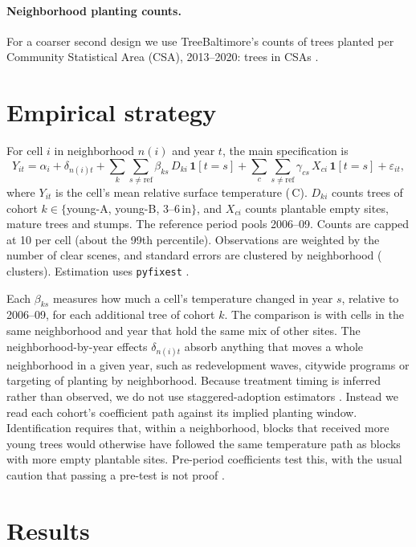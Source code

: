 \documentclass[11pt]{article}
\newcommand{\degC}{\,\textdegree C}
\begin{document}
\paragraph{Neighborhood planting counts.} For a coarser second design we use TreeBaltimore's counts of trees planted per Community Statistical Area (CSA), 2013--2020: \CSATrees{} trees in \NCSA{} CSAs \citep{bnia}.

\section{Empirical strategy}

For cell $i$ in neighborhood $n(i)$ and year $t$, the main specification is
\begin{equation}
Y_{it} = \alpha_i + \delta_{n(i)t} + \sum_{k}\sum_{s\neq \mathrm{ref}} \beta_{ks}\, D_{ki}\, \mathbf{1}[t=s] + \sum_{c}\sum_{s\neq \mathrm{ref}} \gamma_{cs}\, X_{ci}\, \mathbf{1}[t=s] + \varepsilon_{it},
\label{eq:es}
\end{equation}
where $Y_{it}$ is the cell's mean relative surface temperature (\degC). $D_{ki}$ counts trees of cohort $k\in\{$young-A, young-B, 3--6\,in$\}$, and $X_{ci}$ counts plantable empty sites, mature trees and stumps. The reference period pools 2006--09. Counts are capped at 10 per cell (about the 99th percentile). Observations are weighted by the number of clear scenes, and standard errors are clustered by neighborhood (\NNbhd{} clusters). Estimation uses \texttt{pyfixest} \citep{pyfixest}.

Each $\beta_{ks}$ measures how much a cell's temperature changed in year $s$, relative to 2006--09, for each additional tree of cohort $k$. The comparison is with cells in the same neighborhood and year that hold the same mix of other sites. The neighborhood-by-year effects $\delta_{n(i)t}$ absorb anything that moves a whole neighborhood in a given year, such as redevelopment waves, citywide programs or targeting of planting by neighborhood. Because treatment timing is inferred rather than observed, we do not use staggered-adoption estimators \citep{callaway2021,sun2021}. Instead we read each cohort's coefficient path against its implied planting window. Identification requires that, within a neighborhood, blocks that received more young trees would otherwise have followed the same temperature path as blocks with more empty plantable sites. Pre-period coefficients test this, with the usual caution that passing a pre-test is not proof \citep{roth2022}.

\section{Results}\label{sec:results}
\end{document}

